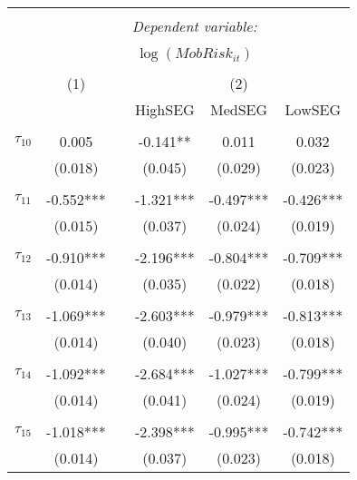 \begin{tabular}{@{\extracolsep{-5pt}}lccccc} 
\\[-1.8ex]\hline 
\hline \\[-1.8ex] 
 & \multicolumn{5}{c}{\textit{Dependent variable:}} \\ 
\cline{2-6} 
\\[-1.8ex] & \multicolumn{5}{c}{$\log(MobRisk_{it})$}\\ 
\\[-1.8ex] & (1) && \multicolumn{3}{c}{(2)} \\ 
\cline{2-2}\cline{4-6}
        &&& HighSEG & MedSEG & LowSEG  \\
 \\[-1.8ex] 
$\tau_{10}$     &   0.005   &&  -0.141** &   0.011   &   0.032   \\
                &  (0.018)  &&  (0.045)  &  (0.029)  &  (0.023)  \\
                &           &&           &           &           \\[-2.1ex]
$\tau_{11}$     & -0.552*** && -1.321*** & -0.497*** & -0.426*** \\
                &  (0.015)  &&  (0.037)  &  (0.024)  &  (0.019)  \\
                &           &&           &           &           \\[-2.1ex]
$\tau_{12}$     & -0.910*** && -2.196*** & -0.804*** & -0.709*** \\
                &  (0.014)  &&  (0.035)  &  (0.022)  &  (0.018)  \\
                &           &&           &           &           \\[-2.1ex]
$\tau_{13}$     & -1.069*** && -2.603*** & -0.979*** & -0.813*** \\
                &  (0.014)  &&  (0.040)  &  (0.023)  &  (0.018)  \\
                &           &&           &           &           \\[-2.1ex]
$\tau_{14}$     & -1.092*** && -2.684*** & -1.027*** & -0.799*** \\
                &  (0.014)  &&  (0.041)  &  (0.024)  &  (0.019)  \\
                &           &&           &           &           \\[-2.1ex]
$\tau_{15}$     & -1.018*** && -2.398*** & -0.995*** & -0.742*** \\
                &  (0.014)  &&  (0.037)  &  (0.023)  &  (0.018)  \\

\end{tabular}

